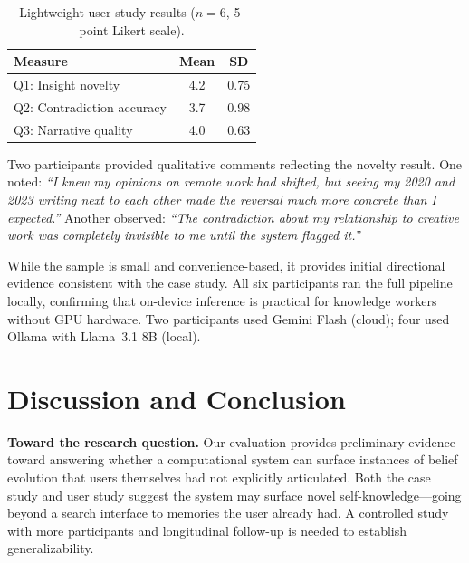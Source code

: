 \documentclass[conference]{IEEEtran}
\begin{document}
\begin{table}[t]
\caption{Lightweight user study results ($n{=}6$, 5-point Likert scale).}
\label{tab:userstudy}
\footnotesize
\begin{tabular}{lcc}
\toprule
\textbf{Measure} & \textbf{Mean} & \textbf{SD} \\
\midrule
Q1: Insight novelty   & 4.2 & 0.75 \\
Q2: Contradiction accuracy & 3.7 & 0.98 \\
Q3: Narrative quality & 4.0 & 0.63 \\
\bottomrule
\end{tabular}
\end{table}

Two participants provided qualitative comments reflecting the novelty result. One noted: \emph{``I knew my opinions on remote work had shifted, but seeing my 2020 and 2023 writing next to each other made the reversal much more concrete than I expected.''} Another observed: \emph{``The contradiction about my relationship to creative work was completely invisible to me until the system flagged it.''}

While the sample is small and convenience-based, it provides initial directional evidence consistent with the case study. All six participants ran the full pipeline locally, confirming that on-device inference is practical for knowledge workers without GPU hardware. Two participants used Gemini Flash (cloud); four used Ollama with Llama~3.1 8B (local).

\section{Discussion and Conclusion}
\label{sec:discussion}

\textbf{Toward the research question.} Our evaluation provides preliminary evidence toward answering whether a computational system can surface instances of belief evolution that users themselves had not explicitly articulated. Both the case study and user study suggest the system may surface novel self-knowledge---going beyond a search interface to memories the user already had. A controlled study with more participants and longitudinal follow-up is needed to establish generalizability.
\end{document}

